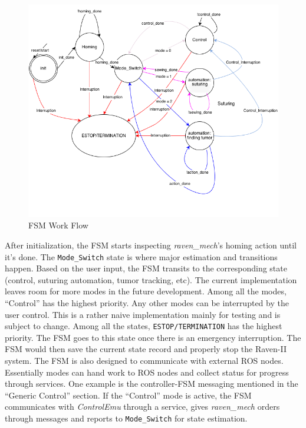 \documentclass[letterpaper,twocolumn,10pt]{article}
\begin{document}
\begin{figure}[h]
  \includegraphics[width=1.0\columnwidth]{FSM.png}
  \caption{FSM Work Flow}
  \label{fig:fsm_workflow}
\end{figure}

After initialization, the FSM starts inspecting \emph{raven\_mech}'s
homing action until it's done. The \texttt{Mode\_Switch} state is
where major estimation and transitions happen. Based on the user
input, the FSM transits to the corresponding state (control, suturing
automation, tumor tracking, etc). The current implementation leaves
room for more modes in the future development. Among all the modes,
``Control'' has the highest priority. Any other modes can be
interrupted by the user control. This is a rather naive implementation
mainly for testing and is subject to change. Among all the states,
\texttt{ESTOP/TERMINATION} has the highest priority. The FSM goes to
this state once there is an emergency interruption. The FSM would then
save the current state record and properly stop the Raven-II
system. The FSM is also designed to communicate with external ROS
nodes. Essentially modes can hand work to ROS nodes and collect status
for progress through services. One example is the controller-FSM
messaging mentioned in the ``Generic Control'' section. If the
``Control'' mode is active, the FSM communicates with
\emph{ControlEmu} through a service, gives \emph{raven\_mech} orders
through messages and reports to \texttt{Mode\_Switch} for state
estimation.
\end{document}
